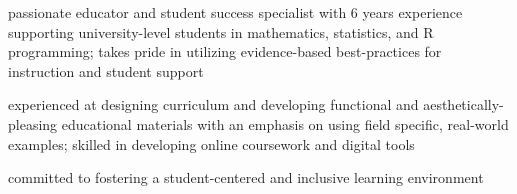 \documentclass[]{deedy-resume-openfont}
\begin{document}
\begin{tightemize}
\item passionate educator and student success specialist with 6 years experience supporting university-level students in mathematics, statistics, and R programming; takes pride in utilizing evidence-based best-practices for instruction and student support
\item experienced at designing curriculum and developing functional and aesthetically-pleasing educational materials with an emphasis on using field specific, real-world examples;  skilled in developing online coursework and digital tools
\item committed to fostering a student-centered and inclusive learning environment
\end{tightemize}
\end{document}
